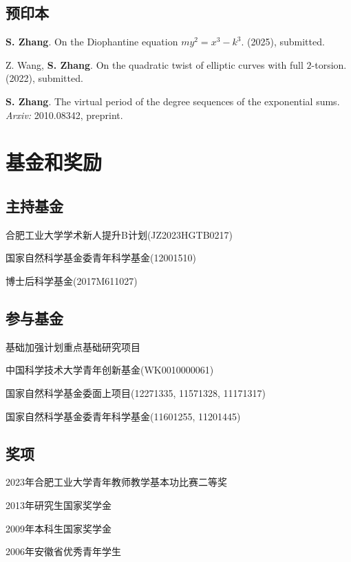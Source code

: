 \documentclass[11pt]{article}
\begin{document}
\subsection{预印本}
\begin{cvlist}
	\item \textbf{S. Zhang}.
	On the Diophantine equation $my^2=x^3-k^3$.
	(2025), submitted.

	\item Z. Wang, \textbf{S. Zhang}.
	On the quadratic twist of elliptic curves with full $2$-torsion.
	(2022), submitted.

	\item \textbf{S. Zhang}.
	The virtual period of the degree sequences of the exponential sums.
	{\em Arxiv:} 2010.08342, preprint.
\end{cvlist}

\section{基金和奖励}
\subsection{主持基金}
\begin{cvlist}
	\item 合肥工业大学学术新人提升B计划(JZ2023HGTB0217)
	\item 国家自然科学基金委青年科学基金(12001510)
	\item 博士后科学基金(2017M611027)
\end{cvlist}


\subsection{参与基金}
\begin{cvlist}
	\item 基础加强计划重点基础研究项目
	\item 中国科学技术大学青年创新基金(WK0010000061)
	\item 国家自然科学基金委面上项目(12271335, 11571328, 11171317)
	\item 国家自然科学基金委青年科学基金(11601255, 11201445)
\end{cvlist}


\subsection{奖项}
\begin{cvlist}
	\item 2023年合肥工业大学青年教师教学基本功比赛二等奖
	\item 2013年研究生国家奖学金
	\item 2009年本科生国家奖学金
	\item 2006年安徽省优秀青年学生
\end{cvlist}
\end{document}
